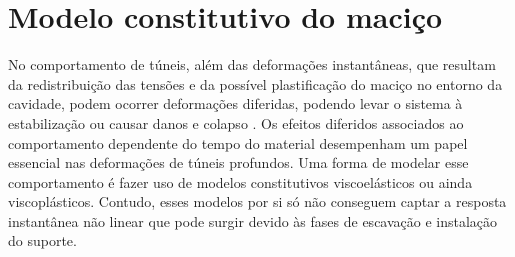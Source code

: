 






\section{Modelo constitutivo do maciço}

No comportamento de túneis, além das deformações instantâneas, que resultam da redistribuição das tensões e da possível plastificação do maciço no entorno da cavidade, podem ocorrer deformações diferidas, podendo levar o sistema à estabilização ou causar danos e colapso \cite{Quevedo2021}. Os efeitos diferidos associados ao comportamento dependente do tempo do material desempenham um papel essencial nas deformações de túneis profundos. Uma forma de modelar esse comportamento é fazer uso de modelos constitutivos viscoelásticos ou ainda viscoplásticos. Contudo, esses modelos por si só não conseguem captar a resposta instantânea não linear que pode surgir devido às fases de escavação e instalação do suporte.



